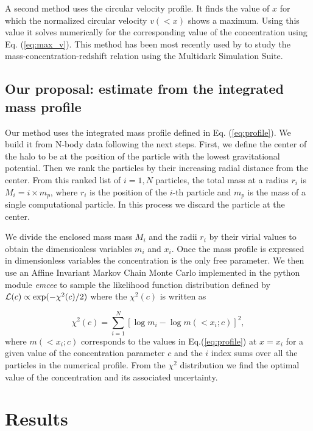 \documentclass[a4,useAMS,usenatbib,usegraphicx]{mn2e}
\begin{document}
A second method uses the circular velocity profile.  
It finds the value of $x$ for which the normalized circular velocity
$v(<x)$ shows a maximum.  
Using this value it solves numerically for the corresponding value of
the concentration using Eq. (\ref{eq:max_v}). 
This method has been most recently used by \cite{Klypin2014} to study
the mass-concentration-redshift relation using the Multidark
Simulation Suite. 


\subsection{Our proposal: estimate from the integrated mass profile}

Our method uses the integrated mass profile defined in
Eq. (\ref{eq:profile}).
We build it from N-body data following the next steps.
First, we define the center of the halo to be at the position of the
particle with the lowest gravitational potential.  
Then we rank the particles by their increasing radial distance from
the center. 
From this ranked list of $i=1,N$ particles, the total mass at a radius
$r_i$ is $M_i=i\times m_p$, where $r_i$ is the position of the $i$-th
particle and $m_p$ is the mass of a single computational particle. 
In this process we discard the particle at the center. 

We divide the enclosed mass mass $M_i$ and the radii $r_i$ by their
virial values to obtain the dimensionless variables $m_i$ and $x_i$.
Once the mass profile is expressed in dimensionless variables the
concentration is the only free parameter. 
We then use an Affine Invariant Markov Chain Monte Carlo implemented in the
python module {\em emcee} \citep{emcee} to sample the likelihood
function distribution defined by ${\cal L}(c)\propto
\exp(-\chi^2(c)/2)$ where the $\chi^2(c)$ is 
written as

\begin{equation}
\chi^2(c)= \sum_{i=1}^{N}[\log m_i - \log m(< x_i;c)]^2,
\end{equation}
%
where $m(<x_i;c)$ corresponds to the values in Eq.(\ref{eq:profile})
at $x=x_i$ for a given value of the concentration parameter $c$ and
the $i$ index sums over all the particles in the numerical profile.
From the $\chi^2$ distribution we find the optimal value of the
concentration and its associated uncertainty.


\section{Results}
\label{sec:results}
\end{document}
